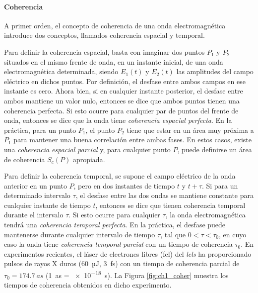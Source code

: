 \paragraph{Coherencia}\label{par:1.1.2.2}
A primer orden, el concepto de coherencia de una onda electromagnética introduce dos conceptos, llamados coherencia espacial y temporal\autocite{sveltoPrinciplesLasers2010}.

Para definir la coherencia espacial, basta con imaginar dos puntos $P_1$ y $P_2$ situados en el mismo frente de onda, en un instante inicial, de una onda electromagnética determinada, siendo $E_1(t)$ y $E_2(t)$ las amplitudes del campo eléctrico en dichos puntos. Por definición, el desfase entre ambos campos en ese instante es cero. Ahora bien, si en cualquier instante posterior, el desfase entre ambos mantiene un valor nulo, entonces se dice que ambos puntos tienen una coherencia perfecta. Si esto ocurre para cualquier par de puntos del frente de onda, entonces se dice que la onda tiene \emph{coherencia espacial perfecta}. En la práctica, para un punto $P_1$, el punto $P_2$ tiene que estar en un área muy próxima a $P_1$ para mantener una buena correlación entre ambas fases. En estos casos, existe una \emph{coherencia espacial parcial} y, para cualquier punto $P$, puede definirse un área de coherencia $S_{c}(P)$ apropiada.

Para definir la coherencia temporal, se supone el campo eléctrico de la onda anterior en un punto $P$, pero en dos instantes de tiempo $t$ y $t+\tau$. Si para un determinado intervalo $\tau$, el desfase entre las dos ondas se mantiene constante para cualquier instante de tiempo $t$, entonces se dice que tienen coherencia temporal durante el intervalo $\tau$. Si esto ocurre para cualquier $\tau$, la onda electromagnética tendrá una \emph{coherencia temporal perfecta}. En la práctica, el desfase puede mantenerse durante cualquier intervalo de tiempo $\tau$, tal que $0<\tau<\tau_0$, en cuyo caso la onda tiene \emph{coherencia temporal parcial} con un tiempo de coherencia $\tau_0$. En experimentos recientes\autocite{zhouAttosecondCoherenceTime2020}, el láser de electrones libres (\acrshort{fel}) del \emph{\acrfull{lcls}} ha proporcionado pulsos de rayos X duros (\qty{60}{µJ}, \qty{3}{fs}) con un tiempo de coherencia parcial de $\tau_0 = \qty{174,7}{as}$ (\qty{1}{as} = \qty{e-18}{s}). La Figura \ref{fig:ch1_coher} muestra los tiempos de coherencia obtenidos en dicho experimento. 

